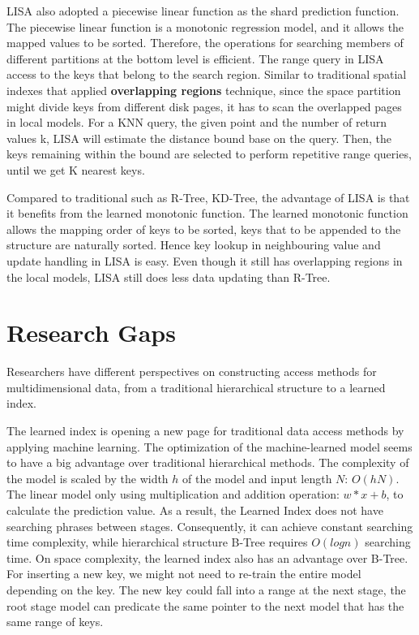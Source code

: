 LISA also adopted a piecewise linear function as the shard prediction function. The piecewise linear function is a monotonic regression model, and it allows the mapped values to be sorted. Therefore, the operations for searching members of different partitions at the bottom level is efficient. The range query in LISA access to the keys that belong to the search region. Similar to traditional spatial indexes that applied \textbf{overlapping regions} technique, since the space partition might divide keys from different disk pages, it has to scan the overlapped pages in local models. For a KNN query, the given point and the number of return values k, LISA will estimate the distance bound base on the query. Then, the keys remaining within the bound are selected to perform repetitive range queries, until we get K nearest keys. 

Compared to traditional such as R-Tree, KD-Tree, the advantage of LISA is that it benefits from the learned monotonic function. The learned monotonic function allows the mapping order of keys to be sorted, keys that to be appended to the structure are naturally sorted. Hence key lookup in neighbouring value and update handling in LISA is easy. Even though it still has overlapping regions in the local models, LISA still does less data updating than R-Tree. 


\section{Research Gaps}
Researchers have different perspectives on constructing access methods for multidimensional data, from a traditional hierarchical structure to a learned index. 

The learned index is opening a new page for traditional data access methods by applying machine learning. The optimization of the machine-learned model seems to have a big advantage over traditional hierarchical methods. The complexity of the model is scaled by the width $h$ of the model and input length $N$: $O(hN)$. The linear model only using multiplication and addition operation: $w*x+b$, to calculate the prediction value. As a result, the Learned Index does not have searching phrases between stages. Consequently, it can achieve constant searching time complexity, while hierarchical structure B-Tree requires $O(logn)$ searching time. On space complexity, the learned index also has an advantage over B-Tree. For inserting a new key, we might not need to re-train the entire model depending on the key. The new key could fall into a range at the next stage, the root stage model can predicate the same pointer to the next model that has the same range of keys. 

